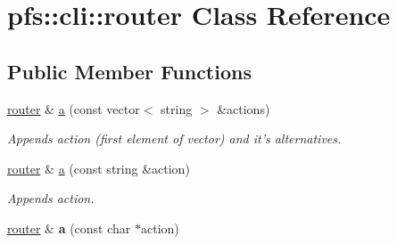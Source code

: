 \hypertarget{classpfs_1_1cli_1_1router}{\section{pfs\-:\-:cli\-:\-:router Class Reference}
\label{classpfs_1_1cli_1_1router}
}
\subsection*{Public Member Functions}
\begin{DoxyCompactItemize}
\item 
\hyperlink{classpfs_1_1cli_1_1router}{router} \& \hyperlink{classpfs_1_1cli_1_1router_ad1372186a8ae4d6c894f4e3ee99ae0c7}{a} (const vector$<$ string $>$ \&actions)
\begin{DoxyCompactList}\small\item\em Appends action (first element of vector) and it's alternatives. \end{DoxyCompactList}\item 
\hyperlink{classpfs_1_1cli_1_1router}{router} \& \hyperlink{classpfs_1_1cli_1_1router_ae429df186a1a6063ef18721766b81f28}{a} (const string \&action)
\begin{DoxyCompactList}\small\item\em Appends action. \end{DoxyCompactList}\item 
\hypertarget{classpfs_1_1cli_1_1router_a7a87166e6632404d92a19b6ae8fdc8a1}{\hyperlink{classpfs_1_1cli_1_1router}{router} \& {\bfseries a} (const char $\ast$action)}\label{classpfs_1_1cli_1_1router_a7a87166e6632404d92a19b6ae8fdc8a1}


\end{DoxyCompactItemize}
